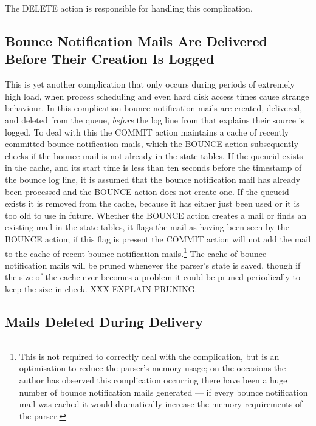The DELETE action is responsible for handling this complication.

\subsection{Bounce Notification Mails Are Delivered Before Their Creation
Is Logged}

\label{Bounce notification mails delivered before their creation is logged}

This is yet another complication that only occurs during periods of
extremely high load, when process scheduling and even hard disk access
times cause strange behaviour.  In this complication bounce notification
mails are created, delivered, and deleted from the queue, \textit{before\/}
the log line from  that explains their source is logged.  To
deal with this the COMMIT action maintains a cache of recently committed
bounce notification mails, which the BOUNCE action subsequently checks if
the bounce mail is not already in the state tables.  If the queueid exists
in the cache, and its start time is less than ten seconds before the
timestamp of the bounce log line, it is assumed that the bounce
notification mail has already been processed and the BOUNCE action does not
create one.  If the queueid exists it is removed from the cache, because it
has either just been used or it is too old to use in future.  Whether the
BOUNCE action creates a mail or finds an existing mail in the state tables,
it flags the mail as having been seen by the BOUNCE action; if this flag is
present the COMMIT action will not add the mail to the cache of recent
bounce notification mails.\footnote{This is not required to correctly deal
with the complication, but is an optimisation to reduce the parser's memory
usage; on the occasions the author has observed this complication occurring
there have been a huge number of bounce notification mails generated --- if
every bounce notification mail was cached it would dramatically increase
the memory requirements of the parser.}  The cache of bounce notification
mails will be pruned whenever the parser's state is saved, though if the
size of the cache ever becomes a problem it could be pruned periodically to
keep the size in check.  XXX EXPLAIN PRUNING\@.

\subsection{Mails Deleted During Delivery}


